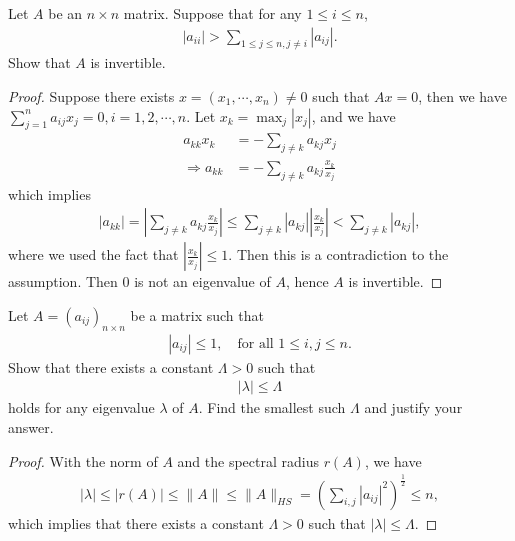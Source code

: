 \documentclass[12pt]{article}
\begin{document}
Let $A$ be an $n\times n$ matrix. Suppose that for any $1 \leq i \leq n$,
\begin{align*}
    |a_{ii}| > \sum_{1\leq j\leq n, j\neq i} |a_{ij}|.
\end{align*}
Show that $A$ is invertible.
\begin{proof}
Suppose there exists $x = (x_1,\cdots, x_n) \neq 0$ such that $Ax = 0$, then we have $\sum^n_{j=1} a_{ij}x_j = 0, i = 1,2,\cdots,n$. Let $x_k = \max_{j}|x_j|$, and we have
\begin{align*}
    a_{kk}x_k & = - \sum_{j\neq k}a_{kj} x_j \\
    \Rightarrow a_{kk} & = - \sum_{j\neq k}a_{kj} \frac{x_k}{x_j} 
\end{align*}
which implies 
\begin{align*}
    |a_{kk}| = \left|\sum_{j\neq k}a_{kj} \frac{x_k}{x_j}\right| \leq \sum_{j\neq k} |a_{kj}| \left|\frac{x_k}{x_j}\right| < \sum_{j\neq k} |a_{kj}|,
\end{align*}
where we used the fact that $\left|\frac{x_k}{x_j}\right| \leq 1$. Then this is a contradiction to the assumption. Then $0$ is not an eigenvalue of $A$, hence $A$ is invertible.
\end{proof}

\medskip

Let $A = \left(a_{ij}\right)_{n\times n}$ be a matrix such that
\begin{align*}
    |a_{ij}| \leq 1, \quad \mbox{for all $1\leq i,j \leq n$.}
\end{align*}
Show that there exists a constant $\Lambda > 0$ such that 
\begin{align*}
    |\lambda| \leq \Lambda
\end{align*}
holds for any eigenvalue $\lambda$ of $A$. Find the smallest such $\Lambda$ and justify your answer.
\begin{proof}
With the norm of $A$ and the spectral radius $r(A)$, we have
\begin{align*}
    |\lambda| \leq |r(A)| \leq \|A\| \leq \|A\|_{HS} = \left(\sum_{i,j}|a_{ij}|^2\right)^{\frac{1}{2}} \leq n,
\end{align*}
which implies that there exists a constant $\Lambda > 0$ such that $|\lambda| \leq \Lambda$.  
\end{proof}
\end{document}
